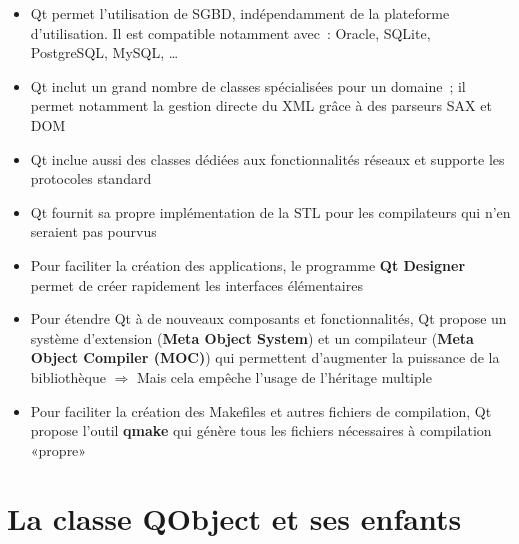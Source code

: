 \documentclass{beamer} %
\begin{document}
\begin{frame}
	\begin{itemize}
	\item Qt permet l'utilisation de SGBD, indépendamment de la plateforme d'utilisation. Il est compatible notamment avec~: Oracle, SQLite, PostgreSQL, MySQL, \ldots
	\item<2-> Qt inclut un grand nombre de classes spécialisées pour un domaine~; il permet notamment la gestion directe du XML grâce à des parseurs SAX et DOM
	\item<3-> Qt inclue aussi des classes dédiées aux fonctionnalités réseaux et supporte les protocoles standard
	\item<4-> Qt fournit sa propre implémentation de la STL pour les compilateurs qui n'en seraient pas pourvus
	\item<5-> Pour faciliter la création des applications, le programme \textbf{Qt Designer} permet de créer rapidement les interfaces élémentaires
	\end{itemize}
\end{frame}

\begin{frame}
	\begin{itemize}
	\item Pour étendre Qt à de nouveaux composants et fonctionnalités, Qt propose un système d'extension (\textbf{Meta Object System}) et un compilateur (\textbf{Meta Object Compiler (MOC)}) qui permettent d'augmenter la puissance de la bibliothèque 
	\newline $\Rightarrow$ Mais cela empêche l'usage de l'héritage multiple
	\item<2-> Pour faciliter la création des Makefiles et autres fichiers de compilation, Qt propose l'outil \textbf{qmake} qui génère tous les fichiers nécessaires à compilation «propre»
	\end{itemize}
\end{frame}

\section{La classe QObject et ses enfants}
\end{document}
